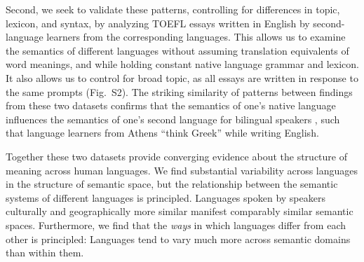 \documentclass[9pt,twocolumn,twoside,lineno]{pnas-new}
\begin{document}
Second, we seek to validate these patterns, controlling for differences in topic, lexicon, and syntax, by analyzing TOEFL essays written in English by second-language learners from the corresponding languages. This allows us to examine the semantics of different languages without assuming translation equivalents of word meanings, and while holding constant native language grammar and lexicon. It also allows us to control for broad topic, as all essays are written in response to the same prompts (Fig.\ S2). The striking similarity of patterns between findings from these two datasets confirms that the semantics of one's native language influences the semantics of one's second language for bilingual speakers \cite{ameel2009semantic, malt2015bidirectional,ameel2005bilinguals, matsuki2021understanding, jarvis2008crosslinguistic, pavlenko2002bidirectional}, such that language learners from Athens ``think Greek'' while writing English. 

Together these two datasets provide converging evidence about the structure of meaning across human languages. We find substantial variability across languages in the structure of semantic space, but the relationship between the semantic systems of different languages is principled. Languages spoken by speakers culturally and geographically more similar manifest comparably similar semantic spaces. Furthermore, we find that the {\it ways} in which languages differ from each other is principled: Languages tend to vary much more across semantic domains than within them. 




\end{document}
